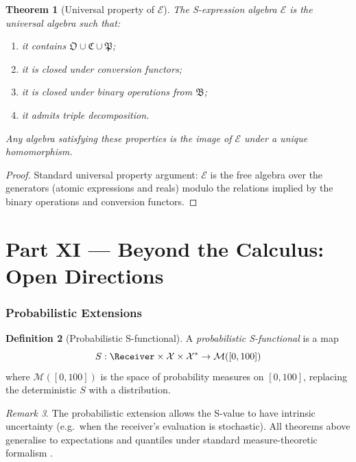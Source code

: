 \documentclass[twocolumn,11pt,a4paper]{article}
\theoremstyle{thmstyle}
\newtheorem{theorem}{Theorem}[section]
\theoremstyle{thmstyle}
\theoremstyle{definition}
\newtheorem{definition}[theorem]{Definition}
\theoremstyle{remark}
\newtheorem{remark}[theorem]{Remark}
\newcommand{\Cands}{\mathcal{X}}
\newcommand{\Truth}{\mathcal{X}^{*}}
\newcommand{\Osc}{\mathfrak{O}}
\newcommand{\Cat}{\mathfrak{C}}
\newcommand{\Part}{\mathfrak{P}}
\newcommand{\Expr}{\mathcal{E}}
\newcommand{\Cat}{\mathfrak{C}}
\newcommand{\Sscalar}{S}
\begin{document}
\begin{theorem}[Universal property of $\Expr$]
\label{thm:univ-expr}
The S-expression algebra $\Expr$ is the universal
algebra such that:
\begin{enumerate}[nosep,label=(\roman*)]
\item it contains $\Osc \cup \Cat \cup \Part$;
\item it is closed under conversion functors;
\item it is closed under binary operations from
      $\mathfrak{B}$;
\item it admits triple decomposition.
\end{enumerate}
Any algebra satisfying these properties is the
image of $\Expr$ under a unique homomorphism.
\end{theorem}

\begin{proof}
Standard universal property argument: $\Expr$ is
the free algebra over the generators (atomic
expressions and reals) modulo the relations
implied by the binary operations and conversion
functors.
\end{proof}



\part*{Part XI --- Beyond the Calculus: Open Directions}

\section{Probabilistic Extensions}
\label{sec:prob-extensions}

\begin{definition}[Probabilistic S-functional]
\label{def:prob-S}
A \emph{probabilistic S-functional} is a map
\[
\Sscalar : \Receiver \times \Cands \times \Truth
   \to \mathcal{M}([0, 100])
\]
where $\mathcal{M}([0, 100])$ is the space of
probability measures on $[0, 100]$, replacing the
deterministic $\Sscalar$ with a distribution.
\end{definition}

\begin{remark}\label{rem:prob-extension}
The probabilistic extension allows the S-value to
have intrinsic uncertainty (e.g.\ when the
receiver's evaluation is stochastic).  All
theorems above generalise to expectations and
quantiles under standard measure-theoretic
formalism \citep{kolmogorov1933}.
\end{remark}
\end{document}
